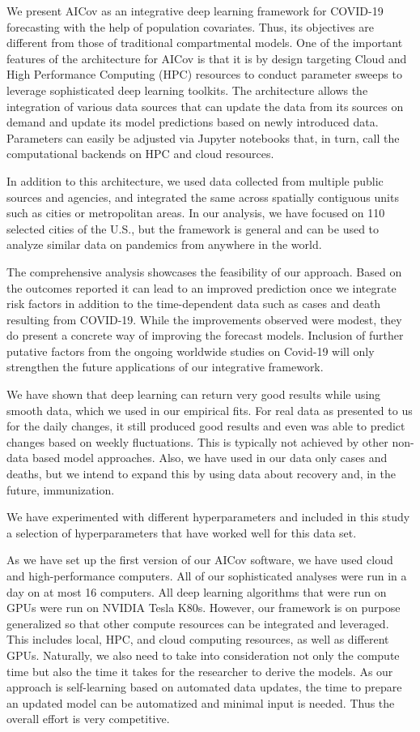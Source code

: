 \documentclass[a4paper, inpress]{jds} %
\renewcommand{\_}{%
    \textunderscore\hspace{0pt}%
}
\begin{document}
We present AICov as an integrative deep learning framework for
COVID-19 forecasting with the help of population covariates. Thus, its
objectives are different from those of traditional compartmental
models. One of the important features of the architecture for AICov is
that it is by design targeting Cloud and High Performance Computing
(HPC) resources to conduct parameter sweeps to leverage sophisticated
deep learning toolkits. The architecture allows the integration of
various data sources that can update the data from its sources on
demand and update its model predictions based on newly introduced
data. Parameters can easily be adjusted via Jupyter notebooks that, in
turn, call the computational backends on HPC and cloud resources.

In addition to this architecture, we used data collected from multiple
public sources and agencies, and integrated the same across spatially
contiguous units such as cities or metropolitan areas. In our
analysis, we have focused on 110 selected cities of the U.S., but the
framework is general and can be used to analyze similar data on
pandemics from anywhere in the world.

The comprehensive analysis showcases the feasibility of our
approach. Based on the outcomes reported it can lead to an improved
prediction once we integrate risk factors in addition to the
time-dependent data such as cases and death resulting from
COVID-19. While the improvements observed were modest, they do present
a concrete way of improving the forecast models. Inclusion of further
putative factors from the ongoing worldwide studies on Covid-19 will
only strengthen the future applications of our integrative framework.

We have shown that deep learning can return very good results while
using smooth data, which we used in our empirical fits. For real data
as presented to us for the daily changes, it still produced good
results and even was able to predict changes based on weekly
fluctuations. This is typically not achieved by other non-data based
model approaches. Also, we have used in our data only cases and
deaths, but we intend to expand this by using data about recovery and,
in the future, immunization.

We have experimented with different hyperparameters and included in
this study a selection of hyperparameters that have worked well for
this data set.


As we have set up the first version of our AICov software, we have
used cloud and high-performance computers. All of our sophisticated
analyses were run in a day on at most 16 computers. All deep learning
algorithms that were run on GPUs were run on NVIDIA Tesla
K80s. However, our framework is on purpose generalized so that other
compute resources can be integrated and leveraged. This includes
local, HPC, and cloud computing resources, as well as different
GPUs. Naturally, we also need to take into consideration not only the
compute time but also the time it takes for the researcher to derive
the models. As our approach is self-learning based on automated data
updates, the time to prepare an updated model can be automatized and
minimal input is needed. Thus the overall effort is very competitive.
\end{document}
